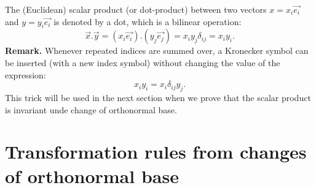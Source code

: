 \documentclass[DIV=12]{article}
\begin{document}
The (Euclidean) scalar product (or dot-product) 
 between two vectors $x=x_ i\vec{e_i}$ and $y=y_i \vec{e_i}$ 
 is denoted by a dot, which is a bilinear operation:
\begin{equation}
\vec{x}.\vec{y} = (x_i \vec{e_i}).(y_j \vec{e_j}) = x_i y_j\delta_{ij} = x_iy_i.
\end{equation}
{\bf{Remark.}} Whenever repeated indices are summed over, a Kronecker symbol
 can be inserted (with a new index symbol) without changing the value of the expression:
\begin{equation}
 x_i y_i = x_i \delta_{ij} y_j.
\end{equation}
 This trick will be used in the next section when we prove that the scalar product
 is invariant unde change of orthonormal base.



\section{Transformation rules from changes of orthonormal base}
\end{document}
